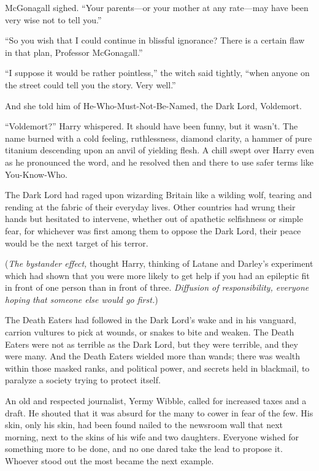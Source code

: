 McGonagall sighed. “Your parents—or your mother at any rate—may have been very wise not to tell you.”

“So you wish that I could continue in blissful ignorance? There is a certain flaw in that plan, Professor McGonagall.”

“I suppose it would be rather pointless,” the witch said tightly, “when anyone on the street could tell you the story. Very well.”

And she told him of He-Who-Must-Not-Be-Named, the Dark Lord, Voldemort.

“Voldemort?” Harry whispered. It should have been funny, but it wasn’t. The name burned with a cold feeling, ruthlessness, diamond clarity, a hammer of pure titanium descending upon an anvil of yielding flesh. A chill swept over Harry even as he pronounced the word, and he resolved then and there to use safer terms like You-Know-Who.

The Dark Lord had raged upon wizarding Britain like a wilding wolf, tearing and rending at the fabric of their everyday lives. Other countries had wrung their hands but hesitated to intervene, whether out of apathetic selfishness or simple fear, for whichever was first among them to oppose the Dark Lord, their peace would be the next target of his terror.

(\emph{The bystander effect,} thought Harry, thinking of Latane and Darley’s experiment which had shown that you were more likely to get help if you had an epileptic fit in front of one person than in front of three. \emph{Diffusion of responsibility, everyone hoping that someone else would go first.})

The Death Eaters had followed in the Dark Lord’s wake and in his vanguard, carrion vultures to pick at wounds, or snakes to bite and weaken. The Death Eaters were not as terrible as the Dark Lord, but they were terrible, and they were many. And the Death Eaters wielded more than wands; there was wealth within those masked ranks, and political power, and secrets held in blackmail, to paralyze a society trying to protect itself.

An old and respected journalist, Yermy Wibble, called for increased taxes and a draft. He shouted that it was absurd for the many to cower in fear of the few. His skin, only his skin, had been found nailed to the newsroom wall that next morning, next to the skins of his wife and two daughters. Everyone wished for something more to be done, and no one dared take the lead to propose it. Whoever stood out the most became the next example.

